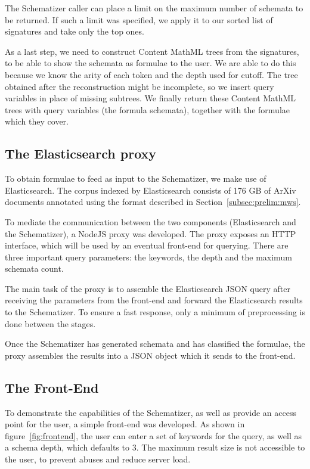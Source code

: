 \documentclass[a4paper,oneside]{article}
\def\cmml{\textsf{Content MathML}\xspace}
\def\arxiv{\textsf{ArXiv}\xspace}
\begin{document}
The Schematizer caller can place a limit on the maximum number of schemata to be
returned. If such a limit was specified, we apply it to our sorted list of
signatures and take only the top ones.

As a last step, we need to construct \cmml trees from the signatures,
to be able to show the schemata as formulae to the user. We are able to do
this because we know the arity of each token and the depth used for cutoff.
The tree obtained after the reconstruction might be incomplete, so we insert
query variables in place of missing subtrees.
We finally return these \cmml trees with query variables (the formula
schemata), together with the formulae which they cover.

\subsection{The Elasticsearch proxy}\label{subsec:esproxy}
To obtain formulae to feed as input to the Schematizer, we make use of
Elasticsearch. The corpus indexed by Elasticsearch consists of 176 GB of \arxiv
documents annotated using the format described in
Section~\ref{subsec:prelim:mws}.

To mediate the communication between the two components (Elasticsearch and the
Schematizer), a NodeJS proxy was developed. The proxy exposes an HTTP
interface, which will be used by an eventual front-end for querying.
There are three important query parameters: the keywords, the depth and the
maximum schemata count.

The main task of the proxy is to assemble the Elasticsearch JSON query after
receiving the parameters from the front-end and forward the Elasticsearch
results to the Schematizer. To ensure a fast response, only a minimum of
preprocessing is done between the stages.

Once the Schematizer has generated schemata and has classified the formulae,
the proxy assembles the results into a JSON object which it sends to the
front-end.

\subsection{The Front-End}\label{subsec:frontend}
To demonstrate the capabilities of the Schematizer, as well as provide an
access point for the user, a simple front-end was developed.
As shown in figure~\ref{fig:frontend}, the user can enter a set of keywords for
the query, as well as a schema depth, which defaults to 3. The maximum result
size is not accessible to the user, to prevent abuses and reduce server load.
\end{document}
